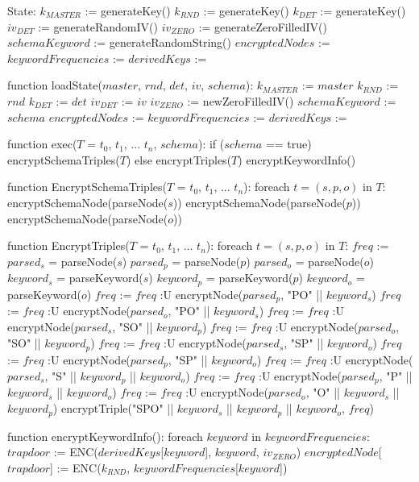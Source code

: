 State:
    $k_{MASTER}$ := generateKey() 
    $k_{RND}$ := generateKey() 
    $k_{DET}$ := generateKey()
    $iv_{DET}$ := generateRandomIV()
    $iv_{ZERO}$ := generateZeroFilledIV()
    $schemaKeyword$ := generateRandomString()
    $encryptedNodes$ := {}
    $keywordFrequencies$ := {}
    $derivedKeys$ := {} 
    
function loadState($master$, $rnd$, $det$, $iv$, $schema$):
    $k_{MASTER}$ := $master$ 
    $k_{RND}$ := $rnd$
    $k_{DET}$ := $det$
    $iv_{DET}$ := $iv$
    $iv_{ZERO}$ := newZeroFilledIV()
    $schemaKeyword$ := $schema$
    $encryptedNodes$ := {}
    $keywordFrequencies$ := {}
    $derivedKeys$ := {}

function exec($T$ = {$t_0$, $t_1$, ... $t_n$}, $schema$):
    if ($schema$ == true)
        encryptSchemaTriples($T$)
    else
        encryptTriples($T$)
    encryptKeywordInfo()

function EncryptSchemaTriples($T$ = {$t_0$, $t_1$, ... $t_n$}):
    foreach $t = (s,p,o)$ in $T$:
        encryptSchemaNode(parseNode($s$))
        encryptSchemaNode(parseNode($p$))
        encryptSchemaNode(parseNode($o$))

function EncryptTriples($T$ = {$t_0$, $t_1$, ... $t_n$}):
	foreach $t = (s,p,o)$ in $T$:
        $freq$ := {}
        $parsed_s$ = parseNode($s$)
        $parsed_p$ = parseNode($p$)
        $parsed_o$ = parseNode($o$)
        $keyword_s$ = parseKeyword($s$)
        $keyword_p$ = parseKeyword($p$)
        $keyword_o$ = parseKeyword($o$)
        $freq$ := $freq$ :U {encryptNode($parsed_p$, "PO" || $keyword_s$)}
        $freq$ := $freq$ :U {encryptNode($parsed_o$, "PO" || $keyword_s$)}
        $freq$ := $freq$ :U {encryptNode($parsed_s$, "SO" || $keyword_p$)}
        $freq$ := $freq$ :U {encryptNode($parsed_o$, "SO" || $keyword_p$)}
        $freq$ := $freq$ :U {encryptNode($parsed_s$, "SP" || $keyword_o$)}
        $freq$ := $freq$ :U {encryptNode($parsed_p$, "SP" || $keyword_o$)}
        $freq$ := $freq$ :U {encryptNode($parsed_s$, "S" || $keyword_p$ || $keyword_o$)}
        $freq$ := $freq$ :U {encryptNode($parsed_p$, "P" || $keyword_s$ || $keyword_o$)}
        $freq$ := $freq$ :U {encryptNode($parsed_o$, "O" || $keyword_s$ || $keyword_p$)}
        encryptTriple("SPO" || $keyword_s$ || $keyword_p$ || $keyword_o$, $freq$)

function encryptKeywordInfo():
    foreach $keyword$ in $keywordFrequencies$:
        $trapdoor$ := ENC($derivedKeys$[$keyword$], $keyword$, $iv_{ZERO}$)
        $encryptedNode$[$trapdoor$] := ENC($k_{RND}$, $keywordFrequencies$[$keyword$])

